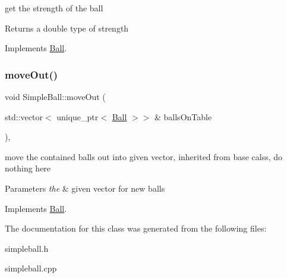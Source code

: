 get the strength of the ball 

\begin{DoxyReturn}{Returns}
a double type of strength 
\end{DoxyReturn}


Implements \mbox{\hyperlink{class_ball_ab659c8dceb67abdd09423814d4fc879e}{Ball}}.

\mbox{\label{class_simple_ball_a1af03353f6c3414e6ce7c12a9b338e72}} 
\subsubsection{\texorpdfstring{move\+Out()}{moveOut()}}
{\footnotesize\ttfamily void Simple\+Ball\+::move\+Out (\begin{DoxyParamCaption}\item[{std\+::vector$<$ unique\+\_\+ptr$<$ \mbox{\hyperlink{class_ball}{Ball}} $>$$>$ \&}]{balls\+On\+Table }\end{DoxyParamCaption})\hspace{0.3cm}{\ttfamily [override]}, {\ttfamily [virtual]}}



move the contained balls out into given vector, inherited from base calss, do nothing here 


\begin{DoxyParams}{Parameters}
{\em the} & given vector for new balls \\
\hline
\end{DoxyParams}


Implements \mbox{\hyperlink{class_ball_a7d3b8c70ee8c61db73692a4d44bbf933}{Ball}}.



The documentation for this class was generated from the following files\+:\begin{DoxyCompactItemize}
\item 
simpleball.\+h\item 
simpleball.\+cpp\end{DoxyCompactItemize}
